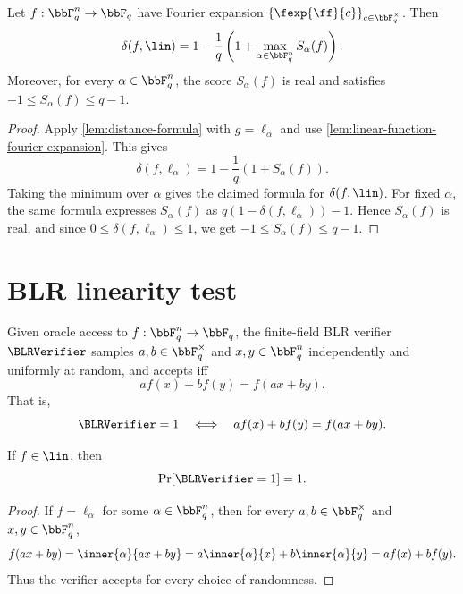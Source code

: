 \begin{lemma}
\label{lem:distance-to-linearity-fourier}
\leanok
Let $f:\bbF_q^n\to\bbF_q$ have Fourier expansion
$\{\fexp{\ff}{c}\}_{c\in\bbF_q^\times}$. Then
\[
    \delta(f,\lin)
    = 1-\frac{1}{q}\left(1+
        \max_{\alpha\in\bbF_q^n}
        S_\alpha(f)
    \right).
\]
Moreover, for every $\alpha\in\bbF_q^n$, the score $S_\alpha(f)$ is real and
satisfies $-1\le S_\alpha(f)\le q-1$.
\end{lemma}

\begin{proof}\leanok
Apply \cref{lem:distance-formula} with $g=\ell_\alpha$ and use
\cref{lem:linear-function-fourier-expansion}. This gives
\[
    \delta(f,\ell_\alpha)
    =1-\frac{1}{q}\left(1+
        S_\alpha(f)
    \right).
\]
Taking the minimum over $\alpha$ gives the claimed formula for
$\delta(f,\lin)$.
For fixed $\alpha$, the same formula expresses $S_\alpha(f)$ as
$q(1-\delta(f,\ell_\alpha))-1$. Hence $S_\alpha(f)$ is real, and since
$0\le \delta(f,\ell_\alpha)\le 1$, we get $-1\le S_\alpha(f)\le q-1$.
\end{proof}

\section{BLR linearity test}

\begin{definition}
\label{def:finite-field-blr-test}
\leanok
Given oracle access to $f:\bbF_q^n\to\bbF_q$, the finite-field BLR verifier
$\BLRVerifier$ samples $a,b\in\bbF_q^\times$ and $x,y\in\bbF_q^n$ independently and uniformly at random, and accepts iff
\[
    a f(x)+b f(y)=f(ax+by).
\]
That is,
\[
    \BLRVerifier=1
    \quad\Longleftrightarrow\quad
    a f(x)+b f(y)=f(ax+by).
\]
\end{definition}

\begin{lemma}[Completeness]
\label{lem:blr-completeness}
\leanok
If $f\in\lin$, then
\[
    \Pr[\BLRVerifier=1]=1.
\]
\end{lemma}

\begin{proof}\leanok
If $f=\ell_\alpha$ for some $\alpha\in\bbF_q^n$, then for every
$a,b\in\bbF_q^\times$ and $x,y\in\bbF_q^n$,
\[
    f(ax+by)
    =\inner{\alpha}{ax+by}
    =a\inner{\alpha}{x}+b\inner{\alpha}{y}
    =a f(x)+b f(y).
\]
Thus the verifier accepts for every choice of randomness.
\end{proof}

